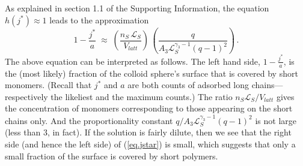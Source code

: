 \documentclass[journal=mamobx,manuscript=article]{achemso}
\newcommand{\leng}{\mathcal{L}}
\begin{document}


As explained in section 1.1 of the Supporting Information, the equation
$h(j^*)\approx 1$ leads to the approximation
\begin{equation}
    \label{eq.jstar}
     1-\frac{j^*}{a}     \; \approx   \; 
        \left(  \frac{n_S\,\leng_S}{V_{latt} }\right) \,\left(   \frac{q}{A_3\leng_S^{\gamma_3-1}(q-1)^2}\right)  \,.
\end{equation}
The above equation can be interpreted as follows.  The left hand side, $1-\frac{j^*}{a}$, is the (most likely) fraction of the colloid sphere's surface that is covered by short monomers.  (Recall that $j^*$ and $a$ are both
counts of adsorbed long chains---respectively the likeliest and the maximum counts.)
The ratio $n_S\leng_S/V_{latt}$ gives
the concentration of monomers corresponding to those appearing on the short chains only.
And the proportionality constant $q/A_3\leng_S^{\gamma_3-1}(q-1)^2$ is not large (less than 3, in fact).
If the solution is fairly dilute, then we see that the right side (and hence the left side) of (\ref{eq.jstar}) is small, which suggests
that only a small fraction of the surface is covered by short polymers.


\end{document}
